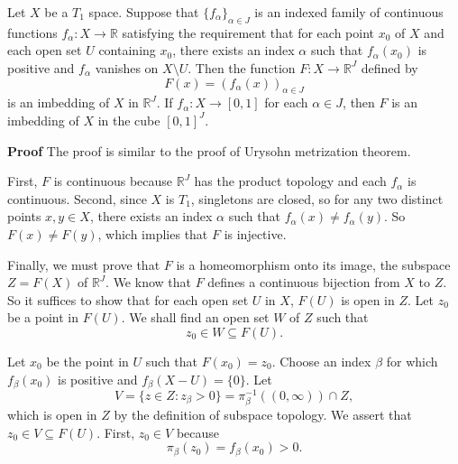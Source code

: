 \documentclass[main.tex]{subfiles}
\begin{document}
\begin{theorem}
    \label{thm:Imbed}
    Let $X$ be a $T_1$ space. Suppose that $\{f_{\alpha}\}_{\alpha \in J}$ is an indexed family of continuous functions $f_{\alpha}: X \to \mathbb{R}$ satisfying the requirement that for each point $x_0$ of $X$ and each open set $U$ containing $x_0$, there exists an index $\alpha$ such that $f_{\alpha}(x_0)$ is positive and $f_{\alpha}$ vanishes on $X \setminus U$. Then the function $F: X \rightarrow \mathbb{R}^J$ defined by
    \begin{equation}
        F(x) = (f_{\alpha}(x))_{\alpha \in J}
    \end{equation}
    is an imbedding of $X$ in $\mathbb{R}^J$. If $f_{\alpha}: X \rightarrow [0, 1]$ for each $\alpha \in J$, then $F$ is an imbedding of $X$ in the cube $[0, 1]^J$. 
\end{theorem}
\par \noindent \textbf{Proof} The proof is similar to the proof of Urysohn metrization theorem. 
\par First, $F$ is continuous because $\mathbb{R}^J$ has the product topology and each $f_{\alpha}$ is continuous. Second, since $X$ is $T_1$, singletons are closed, so for any two distinct points $x, y \in X$, there exists an index $\alpha$ such that $f_{\alpha}(x) \neq f_{\alpha}(y)$. So $F(x) \neq F(y)$, which implies that $F$ is injective. 
\par Finally, we must prove that $F$ is a homeomorphism onto its image, the subspace $Z = F(X)$ of $\mathbb{R}^J$. We know that $F$ defines a continuous bijection from $X$ to $Z$. So it suffices to show that for each open set $U$ in $X$, $F(U)$ is open in $Z$. Let $z_0$ be a point in $F(U)$. We shall find an open set $W$ of $Z$ such that 
\begin{equation}
    z_0 \in W \subseteq F(U).
\end{equation}
\par Let $x_0$ be the point in $U$ such that $F(x_0) = z_0$. Choose an index $\beta$ for which $f_{\beta}(x_0)$ is positive and $f_{\beta}(X - U) = \{0\}$. Let
\begin{equation}
    V = \{z \in Z: z_{\beta} > 0\} = \pi_{\beta}^{-1}((0, \infty)) \cap Z,
\end{equation} 
which is open in $Z$ by the definition of subspace topology. We assert that $z_0\in V \subseteq F(U)$. First, $z_0 \in V$ because  
\begin{equation}
    \pi_{\beta}(z_0) = f_{\beta}(x_0) > 0.
\end{equation}
\end{document}
